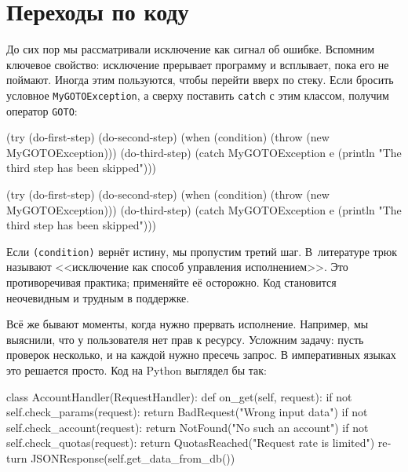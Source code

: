 \section{Переходы по коду}


До сих пор мы рассматривали исключение как сигнал об ошибке. Вспомним ключевое
свойство: исключение прерывает программу и всплывает, пока его не
поймают. Иногда этим пользуются, чтобы перейти вверх по стеку. Если бросить
условное \verb|MyGOTOException|, а сверху поставить \verb|catch| с этим
классом, получим оператор \verb|GOTO|:

\ifx\devicetype\mobile

\begin{english}
  \begin{clojure}
(try
  (do-first-step)
  (do-second-step)
  (when (condition)
    (throw (new MyGOTOException)))
  (do-third-step)
  (catch MyGOTOException e
    (println "The third step
                  has been skipped")))
  \end{clojure}
\end{english}

\else

\begin{english}
  \begin{clojure}
(try
  (do-first-step)
  (do-second-step)
  (when (condition)
    (throw (new MyGOTOException)))
  (do-third-step)
  (catch MyGOTOException e
    (println "The third step has been skipped")))
  \end{clojure}
\end{english}

\fi

Если \verb|(condition)| вернёт истину, мы пропустим третий шаг. В~литературе
трюк называют <<исключение как способ управления исполнением>>. Это
противоречивая практика; применяйте её осторожно. Код становится неочевидным и
трудным в поддержке.


Всё же бывают моменты, когда нужно прервать исполнение. Например, мы
выяснили, что у пользователя нет прав к ресурсу. Усложним задачу: пусть проверок
несколько, и на каждой нужно пресечь запрос. В императивных языках это решается
просто. Код на Python выглядел бы так:

\begin{english}
  \begin{python}
class AccountHandler(RequestHandler):
  def on_get(self, request):
    if not self.check_params(request):
      return BadRequest("Wrong input data")
    if not self.check_account(request):
      return NotFound("No such an account")
    if not self.check_quotas(request):
      return QuotasReached("Request rate is limited")
    return JSONResponse(self.get_data_from_db())
  \end{python}
\end{english}

